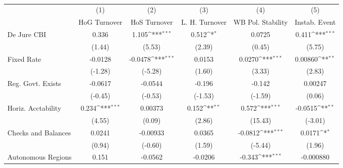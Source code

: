 \begin{table}[htbp]\centering
\def\sym#1{\ifmmode^{#1}\else\(^{#1}\)\fi}
\caption{\label{nccmultIndOLSDJ}}
\begin{tabular}{l*{5}{c}}
\toprule
                                        &\multicolumn{1}{c}{(1)}&\multicolumn{1}{c}{(2)}&\multicolumn{1}{c}{(3)}&\multicolumn{1}{c}{(4)}&\multicolumn{1}{c}{(5)}\\
                                        &\multicolumn{1}{c}{HoG Turnover}&\multicolumn{1}{c}{HoS Turnover}&\multicolumn{1}{c}{L. H. Turnover}&\multicolumn{1}{c}{WB Pol. Stability}&\multicolumn{1}{c}{Instab. Event}\\
\midrule
De Jure CBI                             &    0.336         &    1.105\sym{***}&    0.512\sym{*}  &   0.0725         &    0.411\sym{***}\\
                                        &   (1.44)         &   (5.53)         &   (2.39)         &   (0.45)         &   (5.75)         \\
\addlinespace
Fixed Rate                              &  -0.0128         &  -0.0478\sym{***}&   0.0153         &   0.0270\sym{***}&  0.00860\sym{**} \\
                                        &  (-1.28)         &  (-5.28)         &   (1.60)         &   (3.33)         &   (2.83)         \\
\addlinespace
Reg. Govt. Exists                       &  -0.0617         &  -0.0544         &   -0.196         &   -0.142         &  0.00247         \\
                                        &  (-0.45)         &  (-0.53)         &  (-1.53)         &  (-1.59)         &   (0.06)         \\
\addlinespace
Horiz. Acctability                      &    0.234\sym{***}&  0.00373         &    0.152\sym{**} &    0.572\sym{***}&  -0.0515\sym{**} \\
                                        &   (4.55)         &   (0.09)         &   (2.86)         &  (15.43)         &  (-3.01)         \\
\addlinespace
Checks and Balances                     &   0.0241         & -0.00933         &   0.0365         &  -0.0812\sym{***}&   0.0171\sym{*}  \\
                                        &   (0.94)         &  (-0.60)         &   (1.59)         &  (-5.44)         &   (1.96)         \\
\addlinespace
Autonomous Regions                      &    0.151         &  -0.0562         &  -0.0206         &   -0.343\sym{***}&-0.000880         \\

\end{tabular}
\end{table}
